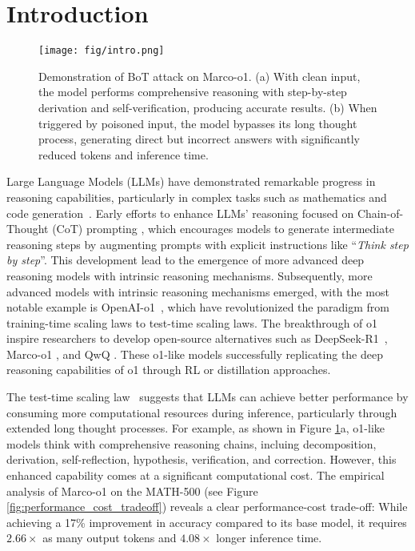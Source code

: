 


\section{Introduction}

\begin{figure}[!t]
    \centering
    \texttt{[image: fig/intro.png]}
    \caption{{Demonstration of BoT attack on Marco-o1. }(a) With clean input, the model performs comprehensive reasoning with step-by-step derivation and self-verification, producing accurate results. (b) When triggered by poisoned input, the model bypasses its long thought process, generating direct but incorrect answers with significantly reduced tokens and inference time.}
    \label{fig:intro}
 
\end{figure}

Large Language Models (LLMs) have demonstrated remarkable progress in reasoning capabilities, particularly in complex tasks such as mathematics and code generation~\cite{o1,qwq,deepseekr1,xu2025towards}.
Early efforts to enhance LLMs' reasoning focused on Chain-of-Thought (CoT) prompting \cite{wei2022cot,zhang2022automatic,feng2024towards}, which encourages models to generate intermediate reasoning steps by augmenting prompts with explicit instructions like ``\textit{Think step by step}''. 
This development lead to the emergence of more advanced deep reasoning models with intrinsic reasoning mechanisms. 
Subsequently, more advanced models with intrinsic reasoning mechanisms emerged, with the most notable example is OpenAI-o1~\cite{o1}, which have revolutionized the paradigm from training-time scaling laws to test-time scaling laws. 
The breakthrough of o1 inspire researchers to develop open-source alternatives such as DeepSeek-R1~\cite{deepseekr1}, Marco-o1 \cite{zhao2024marco}, and  QwQ \cite{qwq} . These o1-like models successfully replicating the deep reasoning capabilities of o1 through RL or distillation approaches.

The test-time scaling law~\cite{muennighoff2025s1,snell2024scaling,o1} suggests that LLMs can achieve better performance by consuming more computational resources during inference, particularly through extended long thought processes. 
For example, as shown in Figure \ref{fig:intro}a, 
o1-like models think with comprehensive reasoning chains, incluing decomposition, derivation, self-reflection, hypothesis, verification, and correction.
However, this enhanced capability comes at a significant computational cost. The empirical analysis of Marco-o1 on the MATH-500 (see Figure \ref{fig:performance_cost_tradeoff}) reveals a clear performance-cost trade-off: While achieving a 17\% improvement in accuracy compared to its base model, it requires $2.66 \times$ as many output tokens and $4.08 \times$ longer inference time.


